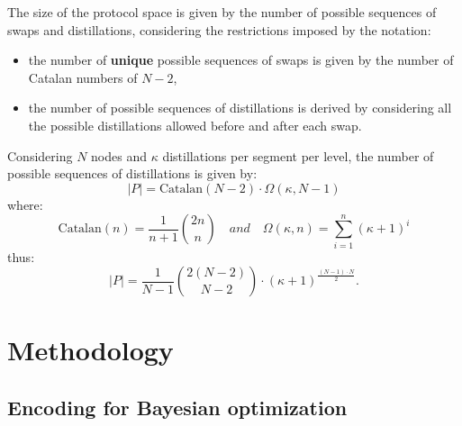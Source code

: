 \documentclass{article}
\begin{document}
The size of the protocol space is given by the number of possible sequences of swaps and distillations, considering the restrictions imposed by the notation:
\begin{itemize}
    \item the number of \textbf{unique} possible sequences of swaps is given by the number of Catalan numbers of $N-2$,
    \item the number of possible sequences of distillations is derived by considering all the possible distillations allowed before and after each swap.
\end{itemize}

Considering $N$ nodes and $\kappa$ distillations per segment per level, the number of possible sequences of distillations is given by:
\begin{equation*}
    |P| = \text{Catalan}(N-2) \cdot \Omega(\kappa, N-1)
\end{equation*}
where:
\begin{equation*}
    \text{Catalan}(n) = \frac{1}{n+1} \binom{2n}{n} \quad and \quad 
    \Omega(\kappa, n) = \sum_{i=1}^{n} (\kappa+1)^i
\end{equation*}
thus:
\begin{equation}
    |P| = \frac{1}{N-1} \binom{2(N-2)}{N-2} \cdot (\kappa+1)^{\frac{(N-1) \cdot N}{2}} .
\end{equation}

\section*{Methodology}

\subsection*{Encoding for Bayesian optimization}
\end{document}
